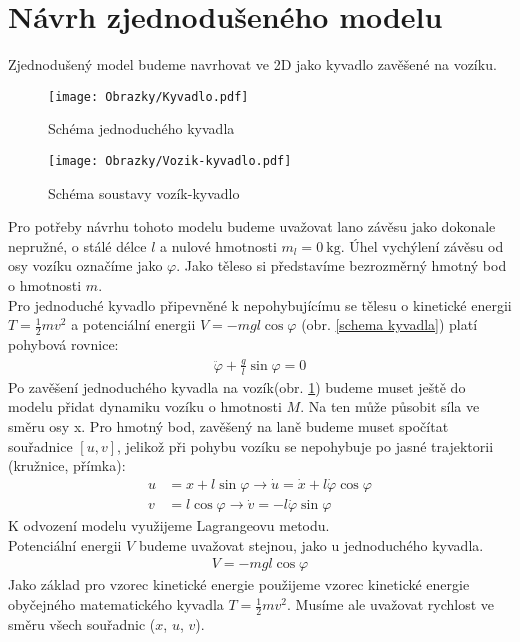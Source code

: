 \documentclass[a4paper, 12pt]{article}
\begin{document}
	\section{Návrh zjednodušeného modelu}
		Zjednodušený model budeme navrhovat ve 2D jako kyvadlo zavěšené na vozíku.
		\begin{wrapfigure}{r}{0pt}
			\texttt{[image: Obrazky/Kyvadlo.pdf]}
			\caption{Schéma jednoduchého kyvadla}
			\label{schema kyvadla}
			\texttt{[image: Obrazky/Vozik-kyvadlo.pdf]}
			\caption{Schéma soustavy vozík-kyvadlo}
			\label{schema vozik-kyvadlo}
		\end{wrapfigure}
		Pro potřeby návrhu tohoto modelu budeme uvažovat lano závěsu jako dokonale nepružné, o stálé délce $l$ a nulové hmotnosti $m_l = \SI{0}{\kilogram}$. Úhel vychýlení závěsu od osy vozíku označíme jako $\varphi$. Jako těleso si představíme bezrozměrný hmotný bod o hmotnosti $m$.\\
		Pro jednoduché kyvadlo připevněné k nepohybujícímu se tělesu o kinetické energii $T = \frac{1}{2}mv^2$ a potenciální energii $V = -mgl\cos\varphi$ (obr. \ref{schema kyvadla}) platí pohybová rovnice:
		\begin{align*}
			\ddot{\varphi}+\frac{g}{l}\sin\varphi=0
		\end{align*}
		Po zavěšení jednoduchého kyvadla na vozík(obr. \ref{schema vozik-kyvadlo}) budeme muset ještě do modelu přidat dynamiku vozíku o hmotnosti $M$. Na ten může působit síla ve směru osy x. Pro hmotný bod, zavěšený na laně budeme muset spočítat souřadnice $\left[u, v\right]$, jelikož při pohybu vozíku se nepohybuje po jasné trajektorii (kružnice, přímka):
		\begin{align*}
			u &= x + l\sin\varphi \rightarrow \dot{u} = \dot{x}+l\dot{\varphi}\cos\varphi\\
			v &= l\cos\varphi \rightarrow \dot{v} = -l\dot{\varphi}\sin\varphi
		\end{align*} 
		K odvození modelu využijeme Lagrangeovu metodu.\\
		Potenciální energii $V$ budeme uvažovat stejnou, jako u jednoduchého kyvadla.
		\begin{align*}
			V = -mgl\cos{\varphi}
		\end{align*}
		Jako základ pro vzorec kinetické energie použijeme vzorec kinetické energie obyčejného matematického kyvadla $T = \frac{1}{2}mv^2$. Musíme ale uvažovat rychlost ve směru všech souřadnic ($x$, $u$, $v$).
\end{document}
